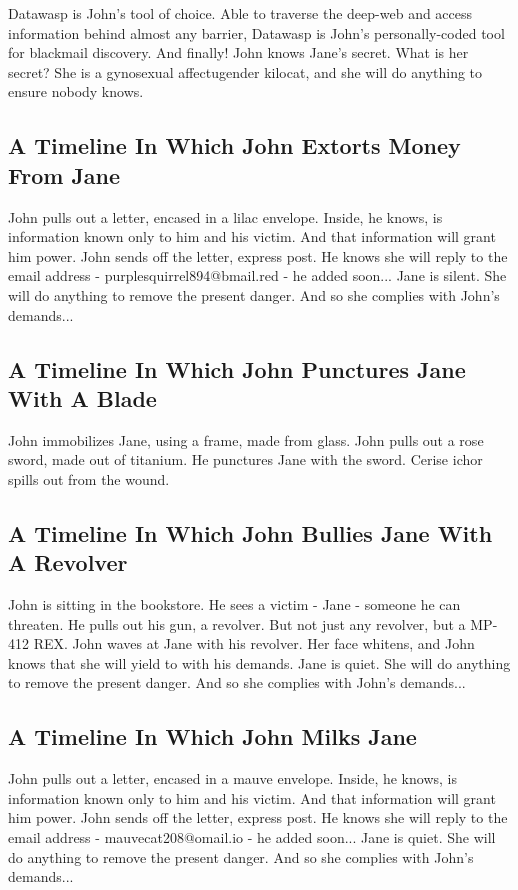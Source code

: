 \documentclass{article}
\begin{document}
Datawasp is John's tool of choice. Able to traverse the deep{-}web and access information behind almost any barrier, Datawasp is John's personally{-}coded tool for blackmail discovery.
And finally!
John knows Jane's secret. What is her secret? She is a gynosexual affectugender kilocat, and she will do anything to ensure nobody knows.
\subsection{A Timeline In Which John Extorts Money From Jane}


John pulls out a letter, encased in a lilac envelope. Inside, he knows, is information known only to him and his victim. And that information will grant him power.
John sends off the letter, express post. He knows she will reply to the email address {-} purplesquirrel894@bmail.red {-} he added soon...
Jane is silent. She will do anything to remove the present danger. And so she complies with John's demands...
\subsection{A Timeline In Which John Punctures Jane With A Blade}


John immobilizes Jane, using a frame, made from glass.
John pulls out a rose sword, made out of titanium.
He punctures Jane with the sword.
Cerise ichor spills out from the wound.
\subsection{A Timeline In Which John Bullies Jane With A Revolver}


John is sitting in the bookstore.
He sees a victim {-} Jane {-} someone he can threaten. He pulls out his gun, a revolver.
But not just any revolver, but a MP{-}412 REX.
John waves at Jane with his revolver. Her face whitens, and John knows that she will yield to with his demands.
Jane is quiet. She will do anything to remove the present danger. And so she complies with John's demands...
\subsection{A Timeline In Which John Milks Jane}


John pulls out a letter, encased in a mauve envelope. Inside, he knows, is information known only to him and his victim. And that information will grant him power.
John sends off the letter, express post. He knows she will reply to the email address {-} mauvecat208@omail.io {-} he added soon...
Jane is quiet. She will do anything to remove the present danger. And so she complies with John's demands...
\end{document}
